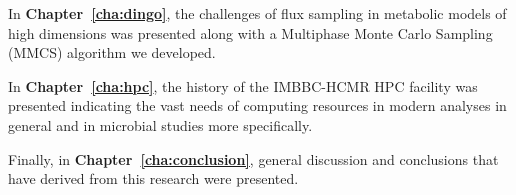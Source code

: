    In \textbf{Chapter~\ref{cha:dingo}}, the challenges of flux sampling in metabolic models of high dimensions was presented along with a Multiphase Monte Carlo Sampling (MMCS) algorithm we developed. 

   In \textbf{Chapter~\ref{cha:hpc}}, the history of the IMBBC-HCMR HPC facility was presented indicating the vast needs of computing resources in modern analyses in general and in microbial studies more specifically. 


   Finally, in \textbf{Chapter~\ref{cha:conclusion}}, general discussion and conclusions that have derived from this research were presented. 





% 
